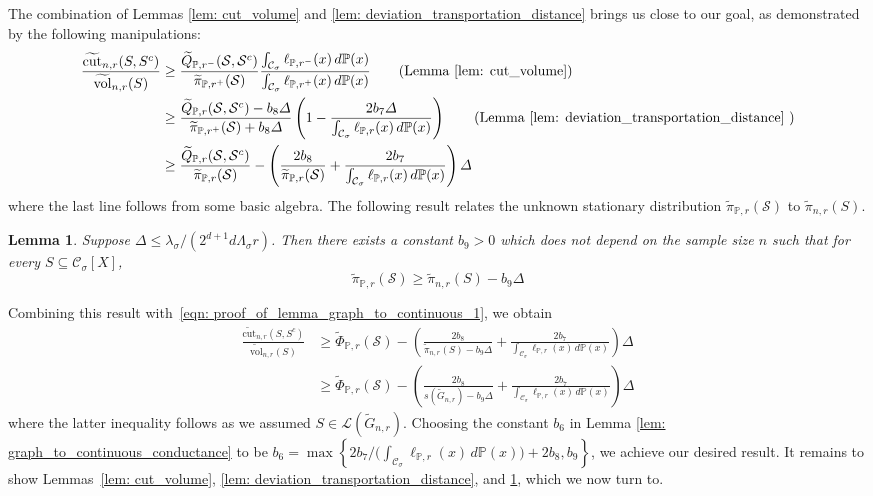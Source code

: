 \documentclass[11pt,twoside]{article}
\newtheorem{lemma}{Lemma}
\theoremstyle{definition}
\newcommand{\set}[1]{\left\{#1\right\}}
\newcommand{\vol}{\mathrm{vol}}
\newcommand{\cut}{\mathrm{cut}}
\newcommand{\1}{\mathbbm{1}}
\newcommand{\Xbf}{X}
\newcommand{\Pbb}{\mathbb{P}}
\newcommand{\Sset}{\mathcal{S}}
\newcommand{\Cset}{\mathcal{C}}
\newcommand{\Csig}{\Cset_{\sigma}}
\begin{document}
The combination of Lemmas \ref{lem: cut_volume} and \ref{lem: deviation_transportation_distance} brings us close to our goal, as demonstrated by the following manipulations:
\begin{align}
\frac{\widetilde{\cut}_{n,r}(S,S^c)}{\widetilde{\vol}_{n,r}(S)} & \geq \frac{\widetilde{Q}_{\Pbb,r^-}(\Sset,\Sset^c)}{\widetilde{\pi}_{\Pbb,r^+}(\Sset)} \frac{\int_{\Csig} \ell_{\Pbb,r^-}(x) \,d\Pbb(x)}{\int_{\Csig} \ell_{\Pbb,r^+}(x) \,d\Pbb(x)} \tag{Lemma \ref{lem: cut_volume}} \\
& \geq \frac{\widetilde{Q}_{\Pbb,r}(\Sset,\Sset^c) - b_8 \varDelta }{\widetilde{\pi}_{\Pbb,r^+}(\Sset) + b_8 \varDelta} \left(1 - \frac{2 b_7 \varDelta}{\int_{\Csig}\ell_{\Pbb,r}(x)\,d\Pbb(x)}\right) \tag{Lemma \ref{lem: deviation_transportation_distance} } \\
& \geq \frac{\widetilde{Q}_{\Pbb,r}(\Sset,\Sset^c)}{\widetilde{\pi}_{\Pbb,r}(\Sset)} - \left(\frac{2b_8}{\widetilde{\pi}_{\Pbb,r}(\Sset)} + \frac{2b_7}{\int_{\Csig}\ell_{\Pbb,r}(x)\,d\Pbb(x)}\right)\varDelta \label{eqn: proof_of_lemma_graph_to_continuous_1}
\end{align}
where the last line follows from some basic algebra. The following result relates the unknown stationary distribution $\widetilde{\pi}_{\Pbb,r}(\Sset)$ to $\widetilde{\pi}_{n,r}(S)$.
\begin{lemma}
	\label{lem: continuous_pi_lb}
	Suppose $\varDelta \leq \lambda_{\sigma}/(2^{d+1}d\Lambda_{\sigma}r)$. Then there exists a constant $b_9 > 0$ which does not depend on the sample size $n$ such that for every $S \subseteq \Csig[\Xbf]$,
	\begin{equation*}
	\widetilde{\pi}_{\Pbb,r}(\Sset) \geq \widetilde{\pi}_{n,r}(S) - b_9 \varDelta
	\end{equation*}
\end{lemma}
Combining this result with~\eqref{eqn: proof_of_lemma_graph_to_continuous_1}, we obtain
\begin{align*}
\frac{\widetilde{\cut}_{n,r}(S,S^c)}{\widetilde{\vol}_{n,r}(S)} & \geq \widetilde{\Phi}_{\Pbb,r}(\Sset) - \left(\frac{2b_8}{\widetilde{\pi}_{n,r}(S) - b_9\varDelta} + \frac{2b_7}{\int_{\Csig}\ell_{\Pbb,r}(x)\,d\Pbb(x)}\right)\varDelta \\
& \geq \widetilde{\Phi}_{\Pbb,r}(\Sset) - \left(\frac{2b_8}{s(\widetilde{G}_{n,r}) - b_9\varDelta} + \frac{2b_7}{\int_{\Csig}\ell_{\Pbb,r}(x)\,d\Pbb(x)}\right)\varDelta
\end{align*}
where the latter inequality follows as we assumed $S \in \mathcal{L}(\widetilde{G}_{n,r})$. Choosing the constant $b_6$ in Lemma \ref{lem: graph_to_continuous_conductance} to be $b_6 = \max\set{2b_7/\bigl(\int_{\Csig}\ell_{\Pbb,r}(x)\,d\Pbb(x) \bigr) + 2b_8, b_9}$, we achieve our desired result. It remains to show Lemmas~\ref{lem: cut_volume}, \ref{lem: deviation_transportation_distance}, and \ref{lem: continuous_pi_lb}, which we now turn to.
\end{document}

